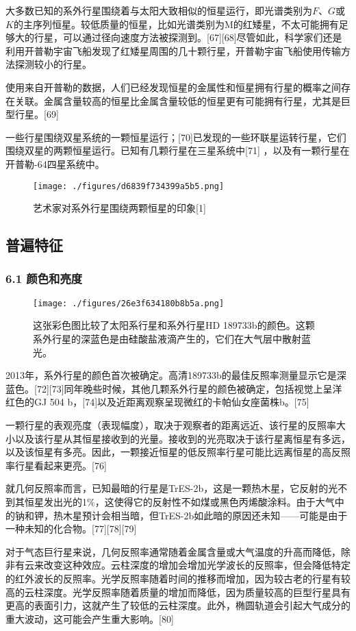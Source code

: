 大多数已知的系外行星围绕着与太阳大致相似的恒星运行，即光谱类别为$F$、$G$或$K$的主序列恒星。较低质量的恒星，比如光谱类别为M的红矮星，不太可能拥有足够大的行星，可以通过径向速度方法被探测到。[67][68]尽管如此，科学家们还是利用开普勒宇宙飞船发现了红矮星周围的几十颗行星，开普勒宇宙飞船使用传输方法探测较小的行星。

使用来自开普勒的数据，人们已经发现恒星的金属性和恒星拥有行星的概率之间存在关联。金属含量较高的恒星比金属含量较低的恒星更有可能拥有行星，尤其是巨型行星。[69]

一些行星围绕双星系统的一颗恒星运行；[70]已发现的一些环联星运转行星，它们围绕双星的两颗恒星运行。已知有几颗行星在三星系统中[71] ，以及有一颗行星在开普勒-64四星系统中。
\begin{figure}[ht]
\centering
\texttt{[image: ./figures/d6839f734399a5b5.png]}
\caption{艺术家对系外行星围绕两颗恒星的印象[1]} \label{fig_TYXWXX_10}
\end{figure}

\subsection{普遍特征}
\subsubsection{6.1 颜色和亮度}
\begin{figure}[ht]
\centering
\texttt{[image: ./figures/26e3f634180b8b5a.png]}
\caption{这张彩色图比较了太阳系行星和系外行星HD 189733b的颜色。这颗系外行星的深蓝色是由硅酸盐液滴产生的，它们在大气层中散射蓝光。} \label{fig_TYXWXX_11}
\end{figure}
2013年，系外行星的颜色首次被确定。高清189733b的最佳反照率测量显示它是深蓝色。[72][73]同年晚些时候，其他几颗系外行星的颜色被确定，包括视觉上呈洋红色的GJ 504 b，[74]以及近距离观察呈现微红的卡帕仙女座菌株b。[75]

一颗行星的表观亮度（表现幅度），取决于观察者的距离远近、该行星的反照率大小以及该行星从其恒星接收到的光量。接收到的光亮取决于该行星离恒星有多远，以及该恒星有多亮。因此，一颗接近恒星的低反照率行星可能比远离恒星的高反照率行星看起来更亮。[76]

就几何反照率而言，已知最暗的行星是TrES-2b，这是一颗热木星，它反射的光不到其恒星发出光的1\%，这使得它的反射性不如煤或黑色丙烯酸涂料。由于大气中的钠和钾，热木星预计会相当暗，但TrES-2b如此暗的原因还未知——可能是由于一种未知的化合物。[77][78][79]

对于气态巨行星来说，几何反照率通常随着金属含量或大气温度的升高而降低，除非有云来改变这种效应。云柱深度的增加会增加光学波长的反照率，但会降低特定的红外波长的反照率。光学反照率随着时间的推移而增加，因为较古老的行星有较高的云柱深度。光学反照率随着质量的增加而降低，因为质量较高的巨型行星具有更高的表面引力，这就产生了较低的云柱深度。此外，椭圆轨道会引起大气成分的重大波动，这可能会产生重大影响。[80]

